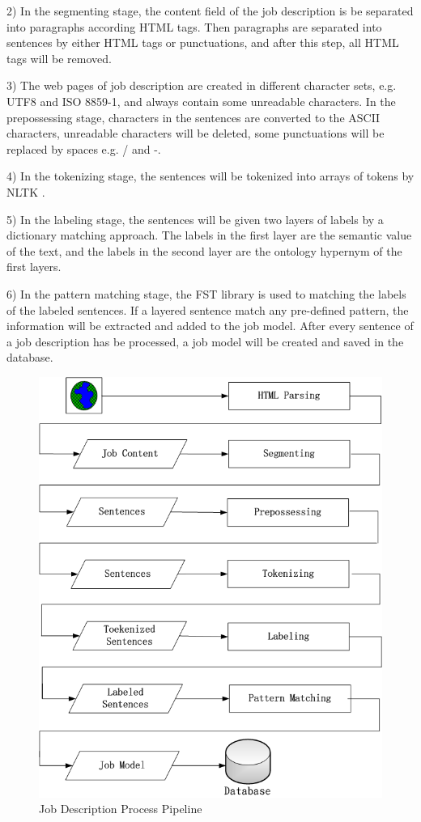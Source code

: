 2) In the segmenting stage, the content field of the job description is be separated into paragraphs according HTML tags. Then paragraphs are separated into sentences by either HTML tags or punctuations, and after this step, all HTML tags will be removed.

3) The web pages of job description are created in different character sets, e.g. UTF8 and ISO 8859-1, and always contain some unreadable characters. In the prepossessing stage, characters in the sentences are converted to the ASCII characters, unreadable characters will be deleted, some punctuations will be replaced by spaces e.g. / and -.

4) In the tokenizing stage, the sentences will be tokenized into arrays of tokens by NLTK \cite{bird2006nltk}.

5) In the labeling stage, the sentences will be given two layers of labels by a dictionary matching approach. The labels in the first layer are the semantic value of the text, and the labels in the second layer are the ontology hypernym of the first layers.

6) In the pattern matching stage, the FST library is used to matching the labels of the labeled sentences.  If a layered sentence match any pre-defined pattern, the information will be extracted and added to the job model. After every sentence of a job description has be processed, a job model will be created and saved in the database.

\begin{figure}[htbp]
  \centering
  \includegraphics[scale=0.4]{images/pipeline2.png}
  \caption{Job Description Process Pipeline}
  \label{fig:Pipeline}
\end{figure}

